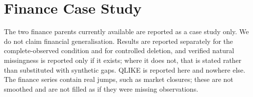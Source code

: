 \documentclass{article}
\begin{document}
\begin{table}[h]
  \caption{Governance contract by input regime. The complete-input rows are contract
  statements, not accuracy results: the expected behaviour is a no-op, and a non-no-op
  there would be a defect rather than an improvement.}
  \label{tab:app-complete}
  \centering
  \small
  \setlength{\tabcolsep}{4pt}
\end{table}

\section{Finance Case Study}
\label{app:finance}
The two finance parents currently available are reported as a case study only. We do not
claim financial generalisation. Results are reported separately for the complete-observed
condition and for controlled deletion, and verified natural missingness is reported only
if it exists; where it does not, that is stated rather than substituted with synthetic
gaps. QLIKE is reported here and nowhere else. The finance series contain real jumps, such
as market closures; these are not smoothed and are not filled as if they were missing
observations.
\end{document}

